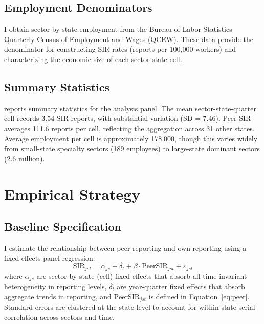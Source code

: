 \documentclass[12pt]{article}
\begin{document}
\subsection{Employment Denominators}

I obtain sector-by-state employment from the Bureau of Labor Statistics Quarterly Census of Employment and Wages (QCEW). These data provide the denominator for constructing SIR rates (reports per 100,000 workers) and characterizing the economic size of each sector-state cell.

\subsection{Summary Statistics}

 reports summary statistics for the analysis panel. The mean sector-state-quarter cell records 3.54 SIR reports, with substantial variation (SD = 7.46). Peer SIR averages 111.6 reports per cell, reflecting the aggregation across 31 other states. Average employment per cell is approximately 178,000, though this varies widely from small-state specialty sectors (189 employees) to large-state dominant sectors (2.6 million).




\section{Empirical Strategy}
\label{sec:strategy}

\subsection{Baseline Specification}

I estimate the relationship between peer reporting and own reporting using a fixed-effects panel regression:
\begin{equation}
\text{SIR}_{jst} = \alpha_{js} + \delta_t + \beta \cdot \text{PeerSIR}_{jst} + \varepsilon_{jst}
\label{eq:main}
\end{equation}
where $\alpha_{js}$ are sector-by-state (cell) fixed effects that absorb all time-invariant heterogeneity in reporting levels, $\delta_t$ are year-quarter fixed effects that absorb aggregate trends in reporting, and $\text{PeerSIR}_{jst}$ is defined in Equation~\eqref{eq:peer}. Standard errors are clustered at the state level to account for within-state serial correlation across sectors and time.
\end{document}
